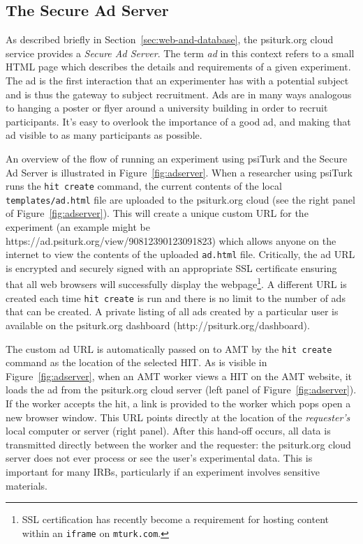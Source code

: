 \documentclass[twocolumn]{svjour3}          %
\newcommand{\psiturk}[0]{\textsf{psiTurk}}
\begin{document}
\subsection{The Secure Ad Server}
\label{sec:adserver}

As described briefly in Section~\ref{sec:web-and-database}, the \textsf{psiturk.org}
cloud service provides a \emph{Secure Ad Server}.  The term \emph{ad} in this context
refers to a small HTML page which describes the details and requirements of a
given experiment.  The ad is the first interaction that an experimenter has
with a potential subject and is thus the gateway to subject recruitment. Ads
are in many ways analogous to hanging a poster or flyer around a university
building in order to recruit participants. It's easy to overlook the importance
of a good ad, and making that ad visible to as many participants as possible.

An overview of the flow of running an experiment using
\psiturk{} and the Secure Ad Server is illustrated in
Figure~\ref{fig:adserver}.  When a researcher using \psiturk{}
runs the \texttt{hit create} command, the current contents of the local
\texttt{templates/ad.html} file are uploaded to the \textsf{psiturk.org} cloud (see
the right panel of Figure~\ref{fig:adserver}).
This will create a unique custom URL for the experiment (an example might be
\textsf{https://ad.psiturk.org/view/90812390123091823}) which
allows anyone on the internet to view the contents of the uploaded \texttt{ad.html}
file.  Critically, the ad URL is encrypted and
securely signed with an appropriate SSL certificate ensuring that all
web browsers will successfully display the webpage\footnote{SSL certification has recently become a requirement for hosting content within an \texttt{iframe} on \texttt{mturk.com}.}. A different URL is created each time \texttt{hit create}
is run and there is no limit to the number of ads that can be created.  A private listing of all ads created by a particular user is available on the \textsf{psiturk.org} dashboard (\textsf{http://psiturk.org/dashboard}).

The custom ad URL is automatically passed
on to AMT by the \texttt{hit create} command as the location of
the selected HIT.  As is visible in Figure~\ref{fig:adserver},
when an AMT worker views a HIT on the AMT
website, it loads the ad from the \textsf{psiturk.org} cloud server (left panel of Figure~\ref{fig:adserver}).  If the worker accepts
the hit, a link is provided to the worker which pops open a new browser
window.  This URL points directly at the location of the \emph{requester's} local computer
or server (right panel).  After this hand-off occurs, all data is transmitted directly between the worker
and the requester: the \textsf{psiturk.org} cloud server does not ever
process or see the user's experimental data.  This is important for many IRBs,
particularly if an experiment involves sensitive materials.
\end{document}
